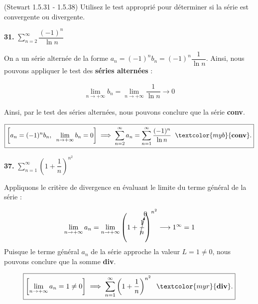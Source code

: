 \documentclass{report}
\begin{document}
 \begin{Exercice}{(Stewart 1.5.31 - 1.5.38)}{}
        Utilisez le test approprié pour déterminer si la  
        série est convergente ou divergente.
    \end{Exercice}


    \vspace{1em}
    \noindent 
    \textbf{31.} $\sum_{n=2}^{\infty }\dfrac{(-1)^n}{\ln n}$   

    On a un série alternée de la forme $a_n = (-1)^n b_n  = (-1)^n \dfrac{1}{\ln n}$.
    Ainsi, nous pouvons appliquer le test des \textbf{séries alternées} :

    \begin{align*}
        \lim\limits_{n \to+\infty } b_n = \lim\limits_{n \to+\infty } \dfrac{1}{\ln n} \longrightarrow 0 
    \end{align*}

    Ainsi, par le test des séries alternées, nous pouvons conclure que la série \textcolor{myb}{\textbf{conv}}.    


    \begin{align*}
        \boxed{
        \left[ a_n = (-1)^n b_n, \;\; \lim\limits_{n \to+\infty } b_n = 0 \right] 
        \implies \sum_{n=2}^{\infty }a_n = 
        \sum_{n=1}^{\infty }  \frac{(-1)^n}{\ln n } \;\; \textcolor{myb}{\textbf{conv}}.  
    }
    \end{align*}



    \vspace{1em}
    \noindent 
    \textbf{37.} $\sum_{n=1}^{\infty }\left( 1 + \dfrac{1}{n}  \right)^{n^2}$

    Appliquons le critère de divergence en évaluant le limite du terme général de la série :

    \begin{align*}
        \lim\limits_{n \to+\infty } a_n = 
        \lim\limits_{n \to+\infty } \left( 1 + \cancelto{0}{\frac{1}{n}} \right)^{n^2}   
        \longrightarrow 1^{\infty} = 1
    \end{align*}
    Puisque le terme général $a_n$ de la série approche la valeur $L = 1 \neq 0$, nous pouvons 
    conclure que la somme \textcolor{myr}{\textbf{div}}. 

    \begin{align*}
        \boxed{
        \left[ \lim\limits_{n \to+\infty } a_n = 1 \neq 0  \right] 
        \implies
        \sum_{n=1}^{\infty } \left( 1 + \dfrac{1}{n}  \right)^{n^2} \;\; \textcolor{myr}{\textbf{div}}. 
    }
    \end{align*}                
\end{document}
